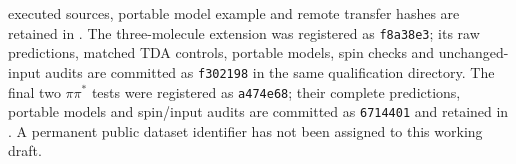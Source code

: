 \documentclass[11pt,a4paper]{article}
\begin{document}
executed sources, portable model example and remote transfer hashes are retained in . The three-molecule extension was registered as \texttt{f8a38e3}; its raw predictions, matched TDA controls, portable models, spin checks and unchanged-input audits are committed as \texttt{f302198} in the same qualification directory. The final two $\pi\pi^*$ tests were registered as \texttt{a474e68}; their complete predictions, portable models and spin/input audits are committed as \texttt{6714401} and retained in . A permanent public dataset identifier has not been assigned to this working draft.



\end{document}
